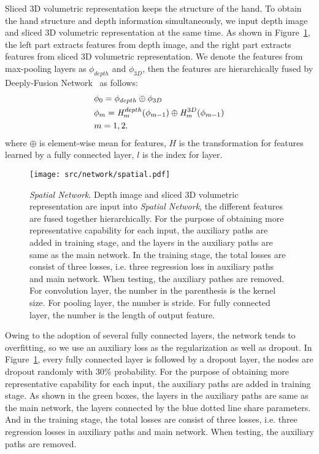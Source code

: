 \documentclass[journal,comsoc]{IEEEtran}
\let\MYoriglatexcaption\caption
\renewcommand{\caption}[2][\relax]{\MYoriglatexcaption[#2]{#2}}
\begin{document}
Sliced 3D volumetric representation keeps the structure of the hand.
To obtain the hand structure and depth information simultaneously, we input depth image and sliced 3D volumetric
representation at the same time. As shown in Figure~\ref{fig:spatial network}, the left part extracts features from
depth image, and the right part extracts features from sliced 3D volumetric representation. We denote the features
from max-pooling layers as $\phi_{depth}$ and $\phi_{3D}$, then the features are hierarchically fused by Deeply-Fusion
Network~\cite{Chen_2017_CVPR} as follows:
\begin{equation}\label{eq:deep fusion}
\begin{aligned}
&\phi_0 = \phi_{depth} \oplus \phi_{3D} \\
&\phi_m = \mathit{H}_m^{depth}(\phi_{m-1}) \oplus \mathit{H}_m^{3D}(\phi_{m-1}) \\
&m=1, 2.
\vspace{1em}
\end{aligned}
\end{equation}
where $\oplus$ is element-wise mean for features, $\mathit{H}$ is the transformation for features learned by a
fully connected layer, $l$ is the index for layer.

\begin{figure}[htbp]
    \centering
    \texttt{[image: src/network/spatial.pdf]}
    \caption{\emph{Spatial Network}. Depth image and sliced 3D volumetric representation are input
    into \emph{Spatial Network}, the different features are fused together hierarchically. For the
    purpose of obtaining more representative capability for each input, the auxiliary paths are added
    in training stage, and the layers in the auxiliary paths are same as the main network. In the training
    stage, the total losses are consist of three losses, i.e. three regression loss in auxiliary paths
    and main network. When testing, the auxiliary pathes are removed. For convolution layer, the number
    in the parenthesis is the kernel size. For pooling layer, the number is stride. For fully connected
    layer, the number is the length of output feature.}
\label{fig:spatial network}
\end{figure}

Owing to the adoption of several fully connected layers, the network tends to overfitting, so we use
an auxiliary loss as the regularization as well as dropout. In Figure~\ref{fig:spatial network},
every fully connected layer is followed by a dropout layer, the nodes are dropout randomly
with 30\% probability. For the purpose of obtaining more representative capability for each input,
the auxiliary paths are added in training stage. As shown in the green boxes, the layers in the
auxiliary paths are same as the main network, the layers connected by the blue dotted line
share parameters. And in the training stage, the total losses are consist of three losses,
i.e. three regression losses in auxiliary paths and main network. When testing, the auxiliary
paths are removed.\vspace{0.5em}
\end{document}
